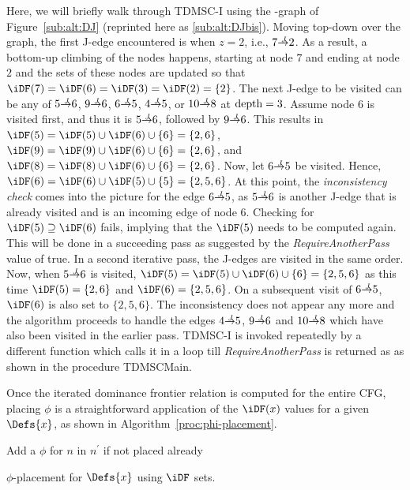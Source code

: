 {%
Here, we will briefly walk through TDMSC-I using the \DJ-graph of 
Figure~\ref{sub:alt:DJ} (reprinted here as \ref{sub:alt:DJbis}).  Moving top-down over the graph, the first J-edge 
encountered is when $z=2$, i.e., $7 \st{J} 2$.  As a result, a bottom-up climbing of the nodes 
happens, starting at node $7$ and ending at node $2$ and the \iDF sets of these 
nodes are updated so that $\iDF(7) = \iDF(6) = \iDF(3) = \iDF(2) = \{2\}$.  The 
next J-edge to be visited can be any of $5 \st{J} 6$, $9 \st{J} 6$, $6 \st{J} 
5$, $4 \st{J} 5$, or $10 \st{J} 8$ at $\textrm{depth} = 3$.  Assume node 
6 is visited first, and thus it is $5 \st{J} 6$, followed by  $9 \st{J} 6$.
This results in $\iDF(5) = \iDF(5) \cup \iDF(6) \cup \{6\} = \{2,6\}$, $\iDF(9) = \iDF(9) \cup \iDF(6) \cup \{6\} = \{2,6\}$, and $\iDF(8) = \iDF(8) \cup \iDF(6) \cup \{6\} = \{2,6\}$.
Now, let $6 \st{J} 5$ be visited. 
Hence, $\iDF(6) = \iDF(6) \cup \iDF(5) \cup \{5\} = \{2,5,6\}$. 
At this point, the \emph{inconsistency check} comes into the picture for the edge $6 \st{J} 5$, as $5 \st{J} 6$ is another J-edge that is already visited and is an incoming edge of node $6$. 
Checking for $\iDF(5) \supseteq \iDF(6)$ fails, implying that the $\iDF(5)$ needs to be computed again. 
This will be done in a succeeding pass as suggested by the \textit{RequireAnotherPass} value of true. 
In a second iterative pass, the J-edges are visited in the same order. 
Now, when $5 \st{J} 6$ is visited, $\iDF(5) = \iDF(5) \cup \iDF(6) \cup \{6\} = \{2,5,6\}$ as this time $\iDF(5) = \{2,6\}$ and $\iDF(6) = \{2,5,6\}$. 
On a subsequent visit of $6 \st{J} 5$, $\iDF(6)$ is also set to $\{2,5,6\}$. 
The inconsistency does not appear any more and the algorithm proceeds to handle the edges $4 \st{J} 5$, $9 \st{J} 6$ and $10 \st{J} 8$ which have also been visited in the earlier pass. 
TDMSC-I is invoked repeatedly by a different function which calls it in a loop till \textit{RequireAnotherPass} is returned as \false as shown in the procedure TDMSCMain.

Once the iterated dominance frontier relation is computed for the entire CFG, placing $\phi$ is a straightforward application of the $\iDF(x)$ values for a given $\Defs{x}$, as shown in Algorithm~\ref{proc:phi-placement}.


\begin{algorithm}
   {
     {
      Add a $\phi$ for $n$ in $n^{'}$ if not placed already
    }
  }
  \caption{$\phi$-placement for $\Defs{x}$ using $\iDF$ sets.}
  \label{proc:phi-placement}


\end{algorithm}}
